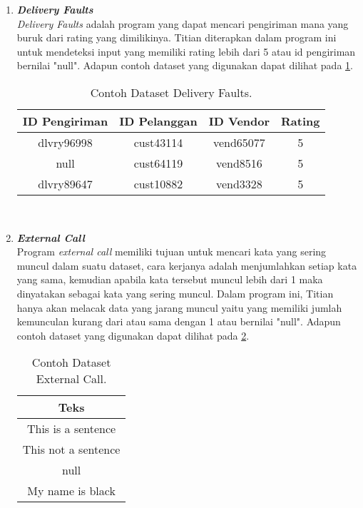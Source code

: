 \begin{enumerate}
      \item \emph{\textbf{Delivery Faults}} \\
            \emph{Delivery Faults} adalah program yang dapat mencari pengiriman mana yang buruk dari rating yang dimilikinya. Titian diterapkan dalam program ini untuk mendeteksi input yang memiliki rating lebih dari 5 atau id pengiriman bernilai "null".
            Adapun contoh dataset yang digunakan dapat 
            dilihat pada \ref{tb:deliveryfaultsdataset}.

            \begin{longtable}{|c|c|c|c|}
                  \caption{Contoh Dataset Delivery Faults.}
                  \label{tb:deliveryfaultsdataset} \\
                  \hline
                  \rowcolor[HTML]{C0C0C0}
                  \textbf{ID Pengiriman} & \textbf{ID Pelanggan} & \textbf{ID Vendor} & \textbf{Rating} \\
                  \hline
                  dlvry96998 & cust43114 & vend65077 & 5 \\
                  null & cust64119 & vend8516 & 5 \\
                  dlvry89647 & cust10882 & vend3328 & 5 \\
                  \hline
            \end{longtable}

      \

      \item \emph{\textbf{External Call}} \\
            Program \emph{external call} memiliki tujuan untuk mencari kata yang sering muncul dalam suatu dataset, cara kerjanya adalah menjumlahkan setiap kata yang sama, kemudian apabila kata tersebut muncul lebih dari 1 maka dinyatakan sebagai kata yang sering muncul. Dalam program ini, Titian hanya akan melacak data yang jarang muncul yaitu yang memiliki jumlah kemunculan kurang dari atau sama dengan 1 atau bernilai "null".
            Adapun contoh dataset yang digunakan dapat 
            dilihat pada \ref{tb:externalcalldataset}.

            \begin{longtable}{|c|}
                  \caption{Contoh Dataset External Call.}
                  \label{tb:externalcalldataset} \\
                  \hline
                  \rowcolor[HTML]{C0C0C0}
                  \textbf{Teks} \\
                  \hline
                  This is a sentence \\
                  This not a sentence \\
                  null \\
                  My name is black \\
                  \hline
            \end{longtable}


\end{enumerate}
